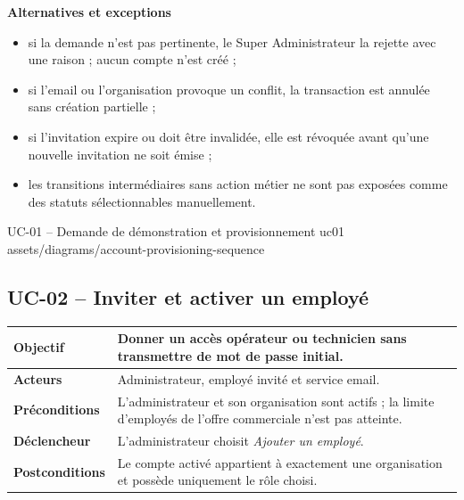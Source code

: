 \textbf{Alternatives et exceptions}
\begin{itemize}[leftmargin=7mm]
  \item si la demande n'est pas pertinente, le Super Administrateur la rejette avec
  une raison ; aucun compte n'est créé ;
  \item si l'email ou l'organisation provoque un conflit, la transaction est annulée
  sans création partielle ;
  \item si l'invitation expire ou doit être invalidée, elle est révoquée avant qu'une
  nouvelle invitation ne soit émise ;
  \item les transitions intermédiaires sans action métier ne sont pas exposées comme
  des statuts sélectionnables manuellement.
\end{itemize}

\UseCaseUmlPlate
  {UC-01 -- Demande de démonstration et provisionnement}
  {uc01}
  {assets/diagrams/account-provisioning-sequence}

\subsection{UC-02 -- Inviter et activer un employé}

\begin{table}[H]
  \centering
  \begin{tabularx}{\textwidth}{|C{3.3cm}|Y|}
    \hline
    \textbf{Objectif} & Donner un accès opérateur ou technicien sans transmettre de
    mot de passe initial.\\\hline
    \textbf{Acteurs} & Administrateur, employé invité et service email.\\\hline
    \textbf{Préconditions} & L'administrateur et son organisation sont actifs ; la
    limite d'employés de l'offre commerciale n'est pas atteinte.\\\hline
    \textbf{Déclencheur} & L'administrateur choisit \emph{Ajouter un employé}.\\\hline
    \textbf{Postconditions} & Le compte activé appartient à exactement une
    organisation et possède uniquement le rôle choisi.\\\hline

  \end{tabularx}
\end{table}

